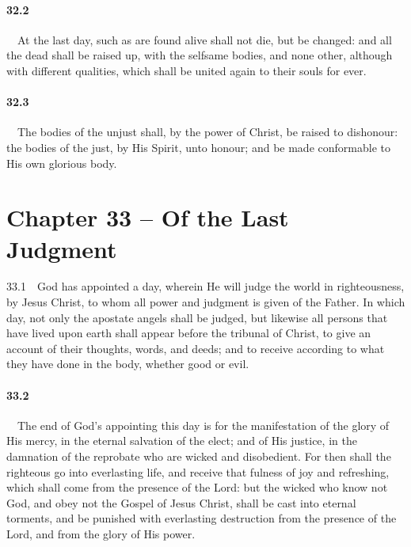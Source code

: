 \paragraph{32.2}\ \ At the last day, such as are found alive shall not die, but be changed: and all the dead shall be raised up, with the selfsame bodies, and none other, although with different qualities, which shall be united again to their souls for ever.   
\bigskip
\paragraph{32.3}\ \ The bodies of the unjust shall, by the power of Christ, be raised to dishonour: the bodies of the just, by His Spirit, unto honour; and be made conformable to His own glorious body.  

\section{Chapter 33 -- Of the Last Judgment} 33.1\ \ God has appointed a day, wherein He will judge the world in righteousness, by Jesus Christ, to whom all power and judgment is given of the Father. In which day, not only the apostate angels shall be judged, but likewise all persons that have lived upon earth shall appear before the tribunal of Christ, to give an account of their thoughts, words, and deeds; and to receive according to what they have done in the body, whether good or evil.   
\bigskip
\paragraph{33.2}\ \ The end of God's appointing this day is for the manifestation of the glory of His mercy, in the eternal salvation of the elect; and of His justice, in the damnation of the reprobate who are wicked and disobedient. For then shall the righteous go into everlasting life, and receive that fulness of joy and refreshing, which shall come from the presence of the Lord: but the wicked who know not God, and obey not the Gospel of Jesus Christ, shall be cast into eternal torments, and be punished with everlasting destruction from the presence of the Lord, and from the glory of His power.   
\bigskip

